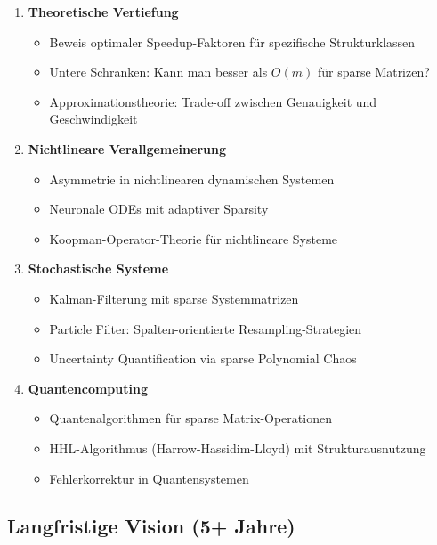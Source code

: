 ﻿\documentclass[a4paper,12pt]{report}
\theoremstyle{definition}
\begin{document}
	\begin{enumerate}
		\item \textbf{Theoretische Vertiefung}
		\begin{itemize}
			\item Beweis optimaler Speedup-Faktoren für spezifische Strukturklassen
			\item Untere Schranken: Kann man besser als $O(m)$ für sparse Matrizen?
			\item Approximationstheorie: Trade-off zwischen Genauigkeit und Geschwindigkeit
		\end{itemize}
		
		\item \textbf{Nichtlineare Verallgemeinerung}
		\begin{itemize}
			\item Asymmetrie in nichtlinearen dynamischen Systemen
			\item Neuronale ODEs mit adaptiver Sparsity
			\item Koopman-Operator-Theorie für nichtlineare Systeme
		\end{itemize}
		
		\item \textbf{Stochastische Systeme}
		\begin{itemize}
			\item Kalman-Filterung mit sparse Systemmatrizen
			\item Particle Filter: Spalten-orientierte Resampling-Strategien
			\item Uncertainty Quantification via sparse Polynomial Chaos
		\end{itemize}
		
		\item \textbf{Quantencomputing}
		\begin{itemize}
			\item Quantenalgorithmen für sparse Matrix-Operationen
			\item HHL-Algorithmus (Harrow-Hassidim-Lloyd) mit Strukturausnutzung
			\item Fehlerkorrektur in Quantensystemen
		\end{itemize}
	\end{enumerate}
	
	\subsection{Langfristige Vision (5+ Jahre)}
	
\end{document}
